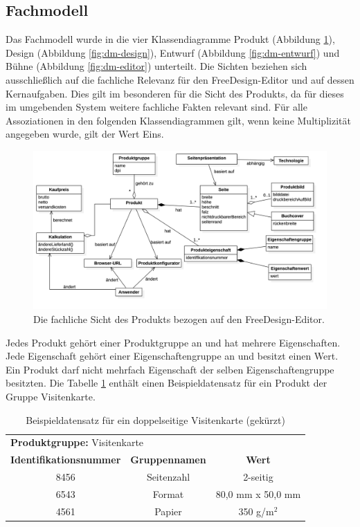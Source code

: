 \subsection{Fachmodell}
Das Fachmodell wurde in die vier Klassendiagramme Produkt (Abbildung \ref{fig:dm-product}), Design (Abbildung \ref{fig:dm-design}), Entwurf (Abbildung \ref{fig:dm-entwurf}) und Bühne (Abbildung \ref{fig:dm-editor}) unterteilt. Die Sichten beziehen sich ausschließlich auf die fachliche Relevanz für den FreeDesign-Editor und auf dessen Kernaufgaben. Dies gilt im besonderen für die Sicht des Produkts, da für dieses im umgebenden System weitere fachliche Fakten relevant sind. 
Für alle Assoziationen in den folgenden Klassendiagrammen gilt, wenn keine Multiplizität angegeben wurde, gilt der Wert Eins. 

\begin{figure}[H]
    \centering
    \caption{Die fachliche Sicht des Produkts bezogen auf den FreeDesign-Editor.}
    \label{fig:dm-product}
    \includegraphics[width=1\textwidth]{diagrams/Soll-Architektur/DM-Produktstruktur.png}
\end{figure}

Jedes Produkt gehört einer Produktgruppe an und hat mehrere Eigenschaften. Jede Eigenschaft gehört einer Eigenschaftengruppe an und besitzt einen Wert. Ein Produkt darf nicht mehrfach Eigenschaft der selben Eigenschaftengruppe besitzten. Die Tabelle \ref{table:BspProdukt} enthält einen Beispieldatensatz für ein Produkt der Gruppe Visitenkarte.
\begin{table}[H]
    \centering
    \caption{Beispieldatensatz für ein doppelseitige Visitenkarte (gekürzt)}
    \label{table:BspProdukt}
    \begin{tabular}{c|c|c}
        \multicolumn{3}{l}{\textbf{Produktgruppe:} Visitenkarte}  \\
        \textbf{Identifikationsnummer} & \textbf{Gruppennamen} & \textbf{Wert} \\
        8456 & Seitenzahl & 2-seitig \\
        6543 & Format & 80,0 mm x 50,0 mm \\
        4561 & Papier & 350 g/m$^2$ \\
    \end{tabular}
\end{table}

